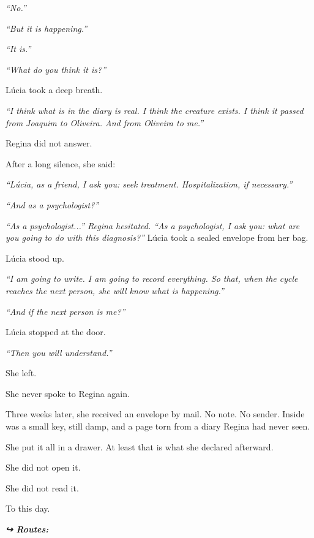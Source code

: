 \noindent \textit{\textquotedblleft{}No.\textquotedblright{}}

\noindent \textit{\textquotedblleft{}But it is happening.\textquotedblright{}}

\noindent \textit{\textquotedblleft{}It is.\textquotedblright{}}

\noindent \textit{\textquotedblleft{}What do you think it is?\textquotedblright{}}

\noindent Lúcia took a deep breath.

\noindent \textit{\textquotedblleft{}I think what is in the diary is real. I think the creature exists. I think it passed from Joaquim to Oliveira. And from Oliveira to me.\textquotedblright{}}

\noindent Regina did not answer.

\noindent After a long silence, she said:

\noindent \textit{\textquotedblleft{}Lúcia, as a friend, I ask you: seek treatment. Hospitalization, if necessary.\textquotedblright{}}

\noindent \textit{\textquotedblleft{}And as a psychologist?\textquotedblright{}}

\noindent \textit{\textquotedblleft{}As a psychologist...\textquotedblright{}\textit{ Regina hesitated. }\textquotedblleft{}As a psychologist, I ask you: what are you going to do with this diagnosis?\textquotedblright{}}
\noindent Lúcia took a sealed envelope from her bag.

\noindent Lúcia stood up.

\noindent \textit{\textquotedblleft{}I am going to write. I am going to record everything. So that, when the cycle reaches the next person, she will know what is happening.\textquotedblright{}}

\noindent \textit{\textquotedblleft{}And if the next person is me?\textquotedblright{}}

\noindent Lúcia stopped at the door.

\noindent \textit{\textquotedblleft{}Then you will understand.\textquotedblright{}}

\noindent She left.

\noindent She never spoke to Regina again.

\noindent Three weeks later, she received an envelope by mail. No note. No sender.
\noindent Inside was a small key, still damp, and a page torn from a diary Regina had never seen.

\noindent She put it all in a drawer.
\noindent At least that is what she declared afterward.

\noindent She did not open it.

\noindent She did not read it.

\noindent To this day.

\vspace{0.5em}
\noindent\textit{\textbf{↪ Routes:}  \rotasep {}}
